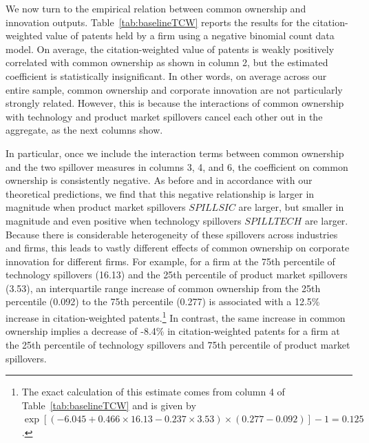 \documentclass[12pt]{article}
\begin{document}
We now turn to the empirical relation between common ownership and innovation outputs. Table~\ref{tab:baselineTCW} reports the results for the citation-weighted value of patents held by a firm using a negative binomial count data model. On average, the citation-weighted value of patents is weakly positively correlated with common ownership as shown in column 2, but the estimated coefficient is statistically insignificant. 
In other words, on average across our entire sample, common ownership and corporate innovation are not particularly strongly related. However, this is because the interactions of common ownership with technology and product market spillovers cancel each other out in the aggregate, as the next columns show.

In particular, once we include the interaction terms between common ownership and the two spillover measures in columns 3, 4, and 6, the coefficient on common ownership is consistently negative. As before and in accordance with our theoretical predictions, we find that this negative relationship is larger in magnitude when product market spillovers $\mathit{SPILLSIC}$ are larger, but smaller in magnitude and even positive when technology spillovers $\mathit{SPILLTECH}$ are larger. Because there is considerable heterogeneity of these spillovers across industries and firms, this leads to vastly different effects of common ownership on corporate innovation for different firms. For example, for a firm at the 75th percentile of technology spillovers (16.13) and the 25th percentile of product market spillovers (3.53), an interquartile range increase of common ownership from the 25th percentile (0.092) to the 75th percentile (0.277) is associated with a 12.5\% increase in citation-weighted patents.\footnote{The exact calculation of this estimate comes from column 4 of Table~\ref{tab:baselineTCW} and is given by $\exp[(-6.045 + 0.466 \times 16.13 - 0.237 \times 3.53) \times (0.277 - 0.092)] - 1 = 0.125$.} In contrast, the same increase in common ownership implies a decrease of -8.4\% in citation-weighted patents for a firm at the 25th percentile of technology spillovers and 75th percentile of product market spillovers. 

% 
\end{document}
